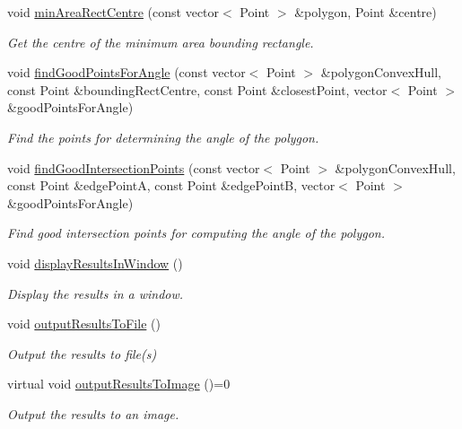 \begin{DoxyCompactItemize}
void \hyperlink{classmultiscale_1_1analysis_1_1Detector_aeef6f9f7e29c79362df3469a0a5caafe}{min\-Area\-Rect\-Centre} (const vector$<$ Point $>$ \&polygon, Point \&centre)
\begin{DoxyCompactList}\small\item\em Get the centre of the minimum area bounding rectangle. \end{DoxyCompactList}\item 
void \hyperlink{classmultiscale_1_1analysis_1_1Detector_a9785ec165eb57a95243c5bcf679bc49b}{find\-Good\-Points\-For\-Angle} (const vector$<$ Point $>$ \&polygon\-Convex\-Hull, const Point \&bounding\-Rect\-Centre, const Point \&closest\-Point, vector$<$ Point $>$ \&good\-Points\-For\-Angle)
\begin{DoxyCompactList}\small\item\em Find the points for determining the angle of the polygon. \end{DoxyCompactList}\item 
void \hyperlink{classmultiscale_1_1analysis_1_1Detector_a2d8fe1a58bc6c792a45ffca988f2afe7}{find\-Good\-Intersection\-Points} (const vector$<$ Point $>$ \&polygon\-Convex\-Hull, const Point \&edge\-Point\-A, const Point \&edge\-Point\-B, vector$<$ Point $>$ \&good\-Points\-For\-Angle)
\begin{DoxyCompactList}\small\item\em Find good intersection points for computing the angle of the polygon. \end{DoxyCompactList}\item 
void \hyperlink{classmultiscale_1_1analysis_1_1Detector_abb6d85e1a13e96b748ea286a070bdf18}{display\-Results\-In\-Window} ()
\begin{DoxyCompactList}\small\item\em Display the results in a window. \end{DoxyCompactList}\item 
void \hyperlink{classmultiscale_1_1analysis_1_1Detector_a2eb7c5f8faefb9b8f09f94f88f804d80}{output\-Results\-To\-File} ()
\begin{DoxyCompactList}\small\item\em Output the results to file(s) \end{DoxyCompactList}\item 
virtual void \hyperlink{classmultiscale_1_1analysis_1_1Detector_a5d10b68605d5a1711527b4b896b3b2cc}{output\-Results\-To\-Image} ()=0
\begin{DoxyCompactList}\small\item\em Output the results to an image. \end{DoxyCompactList}\item 

\end{DoxyCompactItemize}
